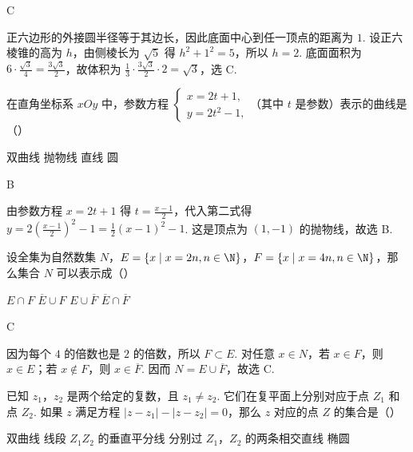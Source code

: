 \begin{answer}
C
\end{answer}

\begin{solution}
正六边形的外接圆半径等于其边长，因此底面中心到任一顶点的距离为 \(1\). 设正六棱锥的高为 \(h\)，由侧棱长为 \(\sqrt{5}\) 得 \(h^2+1^2=5\)，所以 \(h=2\). 底面面积为 \(6\cdot\frac{\sqrt{3}}{4}=\frac{3\sqrt{3}}{2}\)，故体积为 \(\frac{1}{3}\cdot\frac{3\sqrt{3}}{2}\cdot 2=\sqrt{3}\)，选 C.
\end{solution}

\begin{problem}
在直角坐标系 \(xOy\) 中，参数方程 \(\begin{cases}
x=2t+1,\\
y=2t^2-1,
\end{cases}\)（其中 \(t\) 是参数）表示的曲线是（\quad）

\choices
    {双曲线}
    {抛物线}
    {直线}
    {圆}

\end{problem}

\begin{answer}
B
\end{answer}

\begin{solution}
由参数方程 \(x=2t+1\) 得 \(t=\frac{x-1}{2}\)，代入第二式得 \(y=2\left(\frac{x-1}{2}\right)^2-1=\frac{1}{2}(x-1)^2-1\). 这是顶点为 \((1,-1)\) 的抛物线，故选 B.
\end{solution}

\begin{problem}
设全集为自然数集 \(N\)，\(E=\{x\mid x=2n, n\in \N\}\)，\(F=\{x\mid x=4n, n\in \N\}\)，那么集合 \(N\) 可以表示成（\quad）

\choices
    {\(E\cap F\)}
    {\(\overline{E}\cup F\)}
    {\(E\cup \overline{F}\)}
    {\(\overline{E}\cap \overline{F}\)}

\end{problem}

\begin{answer}
C
\end{answer}

\begin{solution}
因为每个 \(4\) 的倍数也是 \(2\) 的倍数，所以 \(F\subset E\). 对任意 \(x\in N\)，若 \(x\in F\)，则 \(x\in E\)；若 \(x\notin F\)，则 \(x\in\overline{F}\). 因而 \(N=E\cup\overline{F}\)，故选 C.
\end{solution}

\begin{problem}
已知 \(z_1\)，\(z_2\) 是两个给定的复数，且 \(z_1\neq z_2\). 它们在复平面上分别对应于点 \(Z_1\) 和点 \(Z_2\). 如果 \(z\) 满足方程 \(\left| z-z_1 \right|-\left| z-z_2 \right|=0\)，那么 \(z\) 对应的点 \(Z\) 的集合是（\quad）

\choices
    {双曲线}
    {线段 \(Z_1Z_2\) 的垂直平分线}
    {分别过 \(Z_1\)，\(Z_2\) 的两条相交直线}
    {椭圆}

\end{problem}

